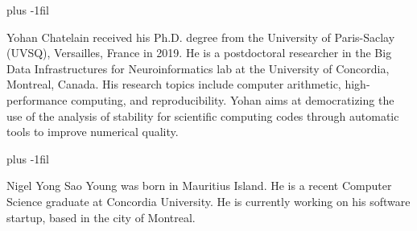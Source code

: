 \documentclass[10pt,journal,compsoc]{IEEEtran}
\begin{document}


% 

\baselineskip plus -1fil
\begin{IEEEbiography}{Yohan Chatelain}
    received his Ph.D. degree from the University of Paris-Saclay
    (UVSQ), Versailles, France in 2019.
    He is a postdoctoral researcher in the Big Data Infrastructures for
    Neuroinformatics lab at the University of Concordia, Montreal, Canada. His
    research topics include computer arithmetic, high-performance computing, and
    reproducibility. Yohan aims at democratizing the use of
    the analysis of stability for scientific computing codes through automatic tools to
    improve numerical quality. 
\end{IEEEbiography}

\baselineskip plus -1fil
\begin{IEEEbiography}{Nigel Yong Sao Young}
    was born in Mauritius Island. He is a recent Computer
    Science graduate at Concordia University. He is currently working on his
    software startup, based in the city of Montreal.
\end{IEEEbiography}
\end{document}
